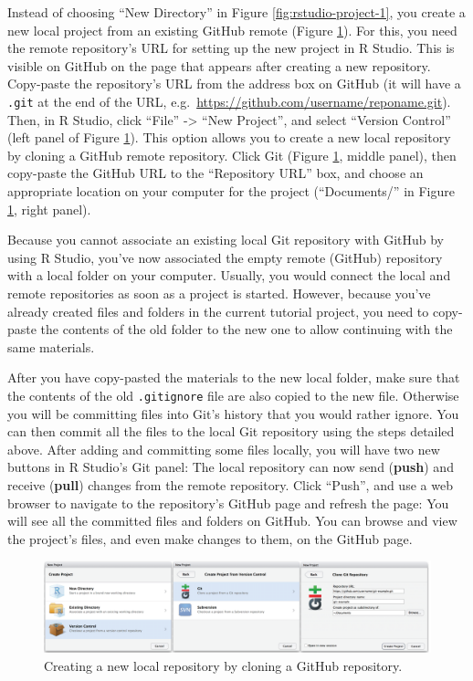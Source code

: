 \documentclass[
  american,
  ,doc,floatsintext]{apa6}
\begin{document}
Instead of choosing \enquote{New Directory} in Figure \ref{fig:rstudio-project-1}, you create a new local project from an existing GitHub remote (Figure \ref{fig:clone-from-github}). For this, you need the remote repository's URL for setting up the new project in R Studio. This is visible on GitHub on the page that appears after creating a new repository. Copy-paste the repository's URL from the address box on GitHub (it will have a \texttt{.git} at the end of the URL, e.g.~\url{https://github.com/username/reponame.git}). Then, in R Studio, click \enquote{File} -\textgreater{} \enquote{New Project}, and select \enquote{Version Control} (left panel of Figure \ref{fig:clone-from-github}). This option allows you to create a new local repository by cloning a GitHub remote repository. Click Git (Figure \ref{fig:clone-from-github}, middle panel), then copy-paste the GitHub URL to the \enquote{Repository URL} box, and choose an appropriate location on your computer for the project (\enquote{Documents/} in Figure \ref{fig:clone-from-github}, right panel).

Because you cannot associate an existing local Git repository with GitHub by using R Studio, you've now associated the empty remote (GitHub) repository with a local folder on your computer. Usually, you would connect the local and remote repositories as soon as a project is started. However, because you've already created files and folders in the current tutorial project, you need to copy-paste the contents of the old folder to the new one to allow continuing with the same materials.

After you have copy-pasted the materials to the new local folder, make sure that the contents of the old \texttt{.gitignore} file are also copied to the new file. Otherwise you will be committing files into Git's history that you would rather ignore. You can then commit all the files to the local Git repository using the steps detailed above. After adding and committing some files locally, you will have two new buttons in R Studio's Git panel: The local repository can now send (\textbf{push}) and receive (\textbf{pull}) changes from the remote repository. Click \enquote{Push}, and use a web browser to navigate to the repository's GitHub page and refresh the page: You will see all the committed files and folders on GitHub. You can browse and view the project's files, and even make changes to them, on the GitHub page.

\begin{figure}

{\centering \includegraphics[width=6in]{images/rstudio-git-clone} 

}

\caption{Creating a new local repository by cloning a GitHub repository.}\label{fig:clone-from-github}
\end{figure}
\end{document}
